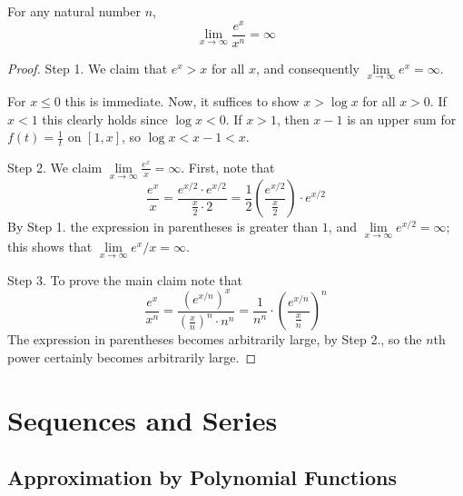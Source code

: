 \documentclass[12pt, a4paper, oneside, openright, titlepage]{book}
\begin{document}
\begin{subappendices}
    \begin{thm}
        For any natural number $n$, \begin{equation}
            \lim\limits_{x\rightarrow \infty}\frac{e^x}{x^n} = \infty
        \end{equation}
    \end{thm}
    \begin{proof}
        Step 1. We claim that $e^x > x$ for all $x$, and consequently $\lim\limits_{x\rightarrow \infty}e^x = \infty$.

        For $x \leq 0$ this is immediate. Now, it suffices to show $x > \log x$ for all $x > 0$. If $x < 1$ this clearly holds since $\log x < 0$. If $x > 1$, then $x-1$ is an upper sum for $f(t) = \frac{1}{t}$ on $[1,x]$, so $\log x < x-1 < x$.


        Step 2. We claim $\lim\limits_{x\rightarrow \infty}\frac{e^x}{x} = \infty$. First, note that \begin{equation*}
            \frac{e^x}{x} = \frac{e^{x/2}\cdot e^{x/2}}{\frac{x}{2}\cdot 2} = \frac{1}{2}\left(\frac{e^{x/2}}{\frac{x}{2}}\right)\cdot e^{x/2}
        \end{equation*}
        By Step 1. the expression in parentheses is greater than $1$, and $\lim\limits_{x\rightarrow \infty}e^{x/2} = \infty$; this shows that $\lim\limits_{x\rightarrow \infty}e^x/x = \infty$.


        Step 3. To prove the main claim note that \begin{equation*}
            \frac{e^x}{x^n} = \frac{(e^{x/n})^x}{\left(\frac{x}{n}\right)^n\cdot n^n} = \frac{1}{n^n}\cdot \left(\frac{e^{x/n}}{\frac{x}{n}}\right)^n
        \end{equation*}
        The expression in parentheses becomes arbitrarily large, by Step 2., so the $n$th power certainly becomes arbitrarily large.
    \end{proof}




\end{subappendices}



\chapter{Sequences and Series}

\section{Approximation by Polynomial Functions}
\end{document}
